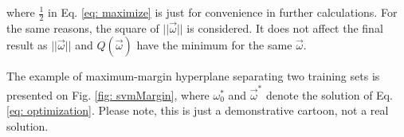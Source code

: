 where $\frac{1}{2}$ in Eq. \ref{eq: maximize} is just for convenience in further calculations. For the same reasons, the square of $||\vec\omega||$ is considered. It does not affect the final result as $||\vec\omega||$ and $Q(\vec\omega)$ have the minimum for the same $\vec\omega$. 

The example of maximum-margin hyperplane separating two training sets is presented on Fig. \ref{fig: svmMargin}, where $\omega_0^*$ and $\vec\omega^*$ denote the solution of Eq. \ref{eq: optimization}. Please note, this is just a demonstrative cartoon, not a real solution.



